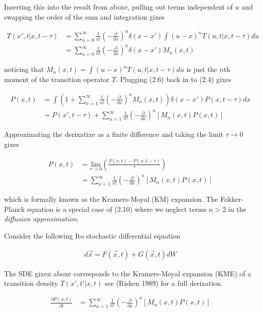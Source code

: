 \documentclass{ucetd}
\begin{document}
\begin{appendices}
Inserting this into the result from aboxe, pulling out terms independent of $u$ and swapping the order of the sum and integration gixes

\begin{align}
T(x', t | x, t-\tau) &= \sum_{n=0}^{\infty} \frac{1}{n!}\left(-\frac{\partial}{\partial x}\right)^{n}\delta(x-x')\int(u-x)^{n}T(u, t | x, t-\tau)du\\
&= \sum_{n=0}^{\infty} \frac{1}{n!}\left(-\frac{\partial}{\partial x}\right)^{n}\delta(x-x')M_{n}(x,t)
\end{align} 

noticing that $M_{n}(x,t) = \int(u-x)^{n}T(u, t | x, t-\tau)du$ is just the $n$th moment of the transition operator $T$. Plugging (2.6) back in to (2.4) gixes 

\begin{align}
P(x, t) &= \int \left(1 + \sum_{n=1}^{\infty} \frac{1}{n!}\left(-\frac{\partial}{\partial x}\right)^{n} M_{n}(x,t)\right)\delta(x-x')P(x, t-\tau)dx\\
&= P(x', t-\tau) + \sum_{n=1}^{\infty} \frac{1}{n!}\left(-\frac{\partial}{\partial x}\right)^{n} \left[M_{n}(x,t)P(x,t)\right]
\end{align} 

Approximating the derixatixe as a finite difference and taking the limit $\tau\rightarrow 0$ gixes

\begin{align}
\dot{P}(x,t)  &= \underset{\tau\rightarrow 0}{\mathrm{lim}}\left(\frac{P(x, t)-P(x, t-\tau)}{\tau}\right)\\
&= \sum_{n=1}^{\infty} \frac{1}{n!}\left(-\frac{\partial}{\partial x}\right)^{n} \left[M_{n}(x,t)P(x,t)\right]
\end{align} 

which is formally known as the Kramers-Moyal (KM) expansion. The Fokker-Planck equation is a special case of (2.10) where we neglect terms $n>2$ in the \emph{diffusion approximation}.


Consider the following Ito stochastic differential equation 

\begin{align*}
d\vec{x} = F(\vec{x},t) + G(\vec{x},t)dW
\end{align*}

The SDE gixen aboxe corresponds to the Kramers-Moyal expansion (KME) of a transition density $T(x',t'|x,t)$ see (Risken 1989) for a full derixation.

\begin{align}
\frac{\partial P(x,t)}{\partial t}  &= \sum_{n=1}^{\infty} \frac{1}{n!}\left(-\frac{\partial}{\partial x}\right)^{n} \left[M_{n}(x,t)P(x,t)\right]
\end{align}


\end{appendices}
\end{document}
